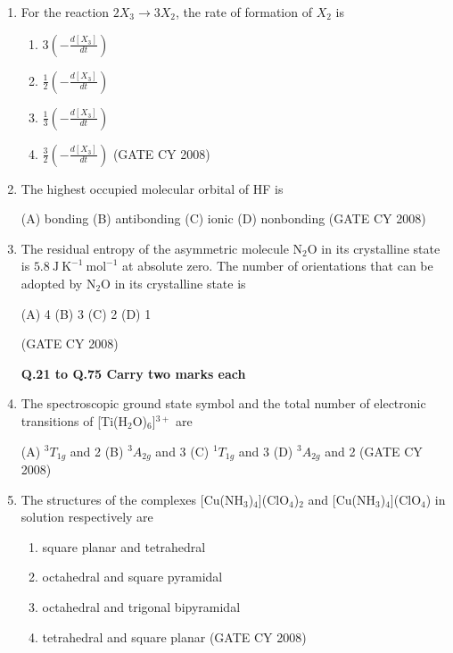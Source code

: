 \documentclass[12pt]{article}
\begin{document}
\begin{enumerate}
    

    \item For the reaction $2 X_3 \rightarrow 3 X_2$, the rate of formation of $X_2$ is
\begin{enumerate}

\item $3 \left(-\frac{d[X_3]}{dt}\right)$ 
\item $\frac{1}{2} \left(-\frac{d[X_3]}{dt}\right)$ 
\item $\frac{1}{3} \left(-\frac{d[X_3]}{dt}\right)$ 
\item $\frac{3}{2} \left(-\frac{d[X_3]}{dt}\right)$    \hfill{(GATE CY 2008)}
\end{enumerate}



\item The highest occupied molecular orbital of HF is
\begin{multicols}{2}
(A) bonding 
(B) antibonding 
(C) ionic 
(D) nonbonding    \hfill{(GATE CY 2008)} 
\end{multicols}


   \item  The residual entropy of the asymmetric molecule N$_2$O in its crystalline state is $5.8\ \mathrm{J\ K^{-1}\ mol^{-1}}$ at absolute zero. The number of orientations that can be adopted by N$_2$O in its crystalline state is
\begin{multicols}{4}
(A) 4 
(B) 3 
(C) 2 
(D) 1    
\end{multicols}
\hfill{(GATE CY 2008)} 



\textbf{Q.21 to Q.75 Carry two marks each}


\item The spectroscopic ground state symbol and the total number of electronic transitions of [Ti(H$_2$O)$_6$]$^{3+}$ are
\begin{multicols}{2}
(A) $^3T_{1g}$ and 2 
(B) $^3A_{2g}$ and 3 
(C) $^1T_{1g}$ and 3 
(D) $^3A_{2g}$ and 2    \hfill{(GATE CY 2008)}
\end{multicols}




\item The structures of the complexes [Cu(NH$_3$)$_4$](ClO$_4$)$_2$ and [Cu(NH$_3$)$_4$](ClO$_4$) in solution respectively are
\begin{enumerate}
\item  square planar and tetrahedral 
\item  octahedral and square pyramidal
\item  octahedral and trigonal bipyramidal 
\item  tetrahedral and square planar    \hfill{(GATE CY 2008)}
\end{enumerate}



\end{enumerate}
\end{document}

